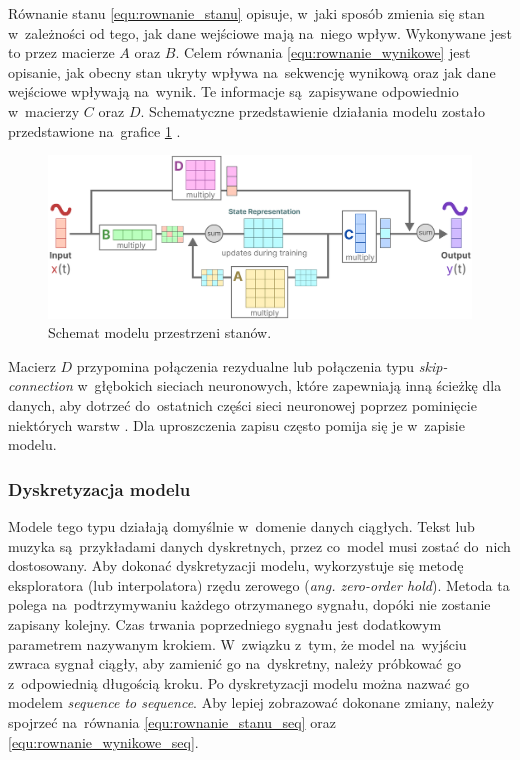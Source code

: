 \documentclass[data-science]{agh-wi} %
\begin{document}
Równanie stanu \ref*{equ:rownanie_stanu} opisuje, w~jaki sposób zmienia się stan w~zależności od tego, jak dane wejściowe mają na~niego wpływ. Wykonywane jest to przez macierze $A$ oraz $B$. Celem równania \ref*{equ:rownanie_wynikowe} jest opisanie, jak obecny stan ukryty wpływa na~sekwencję wynikową oraz jak dane wejściowe wpływają na~wynik. Te informacje są~zapisywane odpowiednio w~macierzy $C$ oraz $D$. Schematyczne przedstawienie działania modelu zostało przedstawione na~grafice \ref*{fig:ssm_scheme} \cite*{mamba_guide}.

\begin{figure}[ht!]
    \begin{center}
        \includegraphics[width=0.9\linewidth]{./img/SSM_scheme.png}
    \end{center}
    \caption{Schemat modelu przestrzeni stanów.}\label{fig:ssm_scheme}
\end{figure}

Macierz $D$ przypomina połączenia rezydualne lub połączenia typu \textit{skip-connection} w~głębokich sieciach neuronowych, które zapewniają inną ścieżkę dla danych, aby dotrzeć do~ostatnich części sieci neuronowej poprzez pominięcie niektórych warstw \cite{resnet}. Dla uproszczenia zapisu często pomija się je w~zapisie modelu.

\subsubsection*{Dyskretyzacja modelu}
Modele tego typu działają domyślnie w~domenie danych ciągłych. Tekst lub muzyka są~przykładami danych dyskretnych, przez co~model musi zostać do~nich dostosowany. Aby dokonać dyskretyzacji modelu, wykorzystuje się metodę eksploratora (lub interpolatora) rzędu zerowego (\textit{ang. zero-order hold}). Metoda ta polega na~podtrzymywaniu każdego otrzymanego sygnału, dopóki nie zostanie zapisany kolejny. Czas trwania poprzedniego sygnału jest dodatkowym parametrem nazywanym krokiem. W~związku z~tym, że model na~wyjściu zwraca sygnał ciągły, aby zamienić go na~dyskretny, należy próbkować go z~odpowiednią długością kroku. Po dyskretyzacji modelu można nazwać go modelem \textit{sequence to sequence}. Aby lepiej zobrazować dokonane zmiany, należy spojrzeć na~równania \ref*{equ:rownanie_stanu_seq} oraz \ref*{equ:rownanie_wynikowe_seq}.
\end{document}
